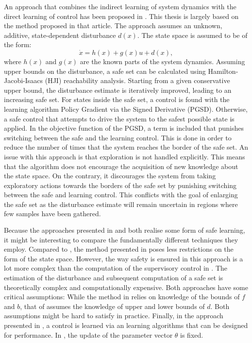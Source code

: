 \documentclass[../main.tex]{subfiles}
\begin{document}
An approach that combines the indirect learning of system dynamics with the direct learning of control has been proposed in \cite{akametalu2014reachability}. This thesis is largely based on the method proposed in that article. The approach assumes an unknown, additive, state-dependent disturbance $d(x)$. The state space is assumed to be of the form:
\begin{equation}
    \dot{x} = h(x)+g(x)u+d(x),
\end{equation}
where $h(x)$ and $g(x)$ are the known parts of the system dynamics.
Assuming upper bounds on the disturbance, a safe set can be calculated using Hamilton-Jacobi-Isaacs (HJI) reachability analysis. Starting from a given conservative upper bound, the disturbance estimate is iteratively improved, leading to an increasing safe set. For states inside the safe set, a control is found with the learning algorithm Policy Gradient via the Signed Derivative (PGSD). Otherwise, a safe control that attempts to drive the system to the safest possible state is applied. In the objective function of the PGSD, a term is included that punishes switching between the safe and the learning control. This is done in order to reduce the number of times that the system reaches the border of the safe set. An issue with this approach is that exploration is not handled explicitly. This means that the algorithm does not encourage the acquisition of new knowledge about the state space. On the contrary, it discourages the system from taking exploratory actions towards the borders of the safe set by punishing switching between the safe and learning control. This conflicts with the goal of enlarging the safe set as the disturbance estimate will remain uncertain in regions where few samples have been gathered. \par

Because the approaches presented in \cite{akametalu2014reachability} and \cite{wang1993stable} both realise some form of safe learning, it might be interesting to compare the fundamentally different techniques they employ.  Compared to \cite{wang1993stable}, the method presented in \cite{akametalu2014reachability} poses less restrictions on the form of the state space. However, the way safety is ensured in this approach is a lot more complex than the computation of the supervisory control in \cite{wang1993stable}. The estimation of the disturbance and subsequent computation of a safe set is theoretically complex and computationally expensive. Both approaches have some critical assumptions: While the method in \cite{wang1993stable} relies on knowledge of the bounds of $f$ and $b$, that of \cite{akametalu2014reachability} assumes the knowledge of upper and lower bounds of $d$. Both assumptions might be hard to satisfy in practice. Finally, in the approach presented in \cite{akametalu2014reachability}, a control is learned via an learning algorithms that can be designed for performance. In \cite{wang1993stable}, the update of the parameter vector $\theta$ is fixed.
\end{document}
